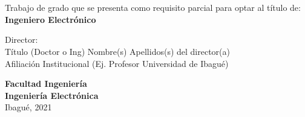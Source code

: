 \begin{titlepage}

\center %


\makeatletter
{ \LARGE \bfseries \thesistitle}\\[1.5cm] %
 
\vspace*{6\baselineskip}

{ \Large \bfseries \authorname}\\[0.7cm] 

\vspace*{2\baselineskip}
\large{ Trabajo de grado que se presenta como requisito parcial para optar al título de:\\
\textbf{Ingeniero Electrónico}}

\vspace*{5\baselineskip}

\large{ Director:\\
Título (Doctor o Ing) Nombre(s) Apellidos(s) del director(a)\\
Afiliación Institucional (Ej. Profesor Universidad de Ibagué)}
 
\vspace*{4\baselineskip}

\vfill
\large{ \bfseries Facultad Ingeniería\\
Ingeniería Electrónica}\\
Ibagué, 2021
\vfill

\end{titlepage}